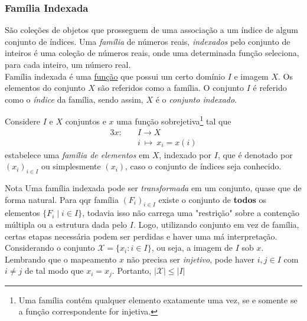       \subsubsection{Família Indexada}
         São coleções de objetos que prosseguem de uma associação a um índice de algum conjunto de índices. Uma \textit{família} de números reais, \textit{indexados} pelo conjunto de inteiros é uma coleção de números reais, onde uma determinada função seleciona, para cada inteiro, um número real.\\
         Família indexada é uma \underline{função} que possui um certo domínio $\mathit{I}$ e imagem $X$.
         Os elementos do conjunto $X$ são referidos como a família.
         O conjunto $\mathit{I}$ é referido como o \textit{índice} da família, sendo assim, $X$ é o \textit{conjunto indexado}.
         \begin{definition}
            Considere $I$ e $X$ conjuntos e $x$ uma função sobrejetiva\footnote[6]{Uma família contém qualquer elemento exatamente uma vez, se e somente se a função correspondente for injetiva.} tal que
            \begin{alignat*}{3}
               x:\quad &\mathit{I} \longrightarrow X\\
               &i\ \mapsto\ x_{i} = x(i)
            \end{alignat*}
            estabelece uma \textit{família de elementos} em $X$, indexado por $\mathit{I}$, que é denotado por $(x_{i})_{i \in \mathit{I}}$ ou simplesmente $(x_{i})$, caso o conjunto de índices seja conhecido.
         \end{definition}
         \begin{mymdframed}{Nota}
            Uma família indexada pode ser \textit{transformada} em um conjunto, quase que de forma natural. Para qqr família $(F_{i})_{i\in \mathit{I}}$ existe o conjunto de \textbf{todos} os elementos $\{F_{i} \mid i \in \mathit{I}\}$, todavia isso não carrega uma "restrição" sobre a contenção múltipla ou a estrutura dada pelo $I$. Logo, utilizando conjunto em vez de família, certas etapas necessária podem ser perdidas e haver uma má interpretação.
            Considerando o conjunto $\mathcal{X} = \{x_{i}: i\in \mathit{I}\}$, ou seja, a imagem de $I$ sob $x$. Lembrando que o mapeamento $x$ não precisa ser \textit{injetivo}, pode haver $i,j \in I$ com $i \neq j$ de tal modo que $x_{i} = x_{j}$. Portanto, $ | \mathcal{X} |  \leq | \mathit{I} | $  
         \end{mymdframed}

